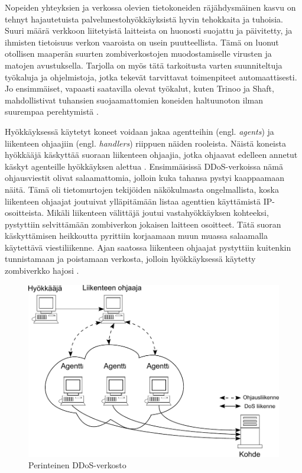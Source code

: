 Nopeiden yhteyksien ja verkossa olevien tietokoneiden räjähdysmäinen
kasvu on tehnyt hajautetuista palvelunestohyökkäyksistä hyvin
tehokkaita ja tuhoisia. Suuri määrä verkkoon liitetyistä laitteista on
huonosti suojattu ja päivitetty, ja ihmisten tietoisuus verkon
vaaroista on usein puutteellista. Tämä on luonut otollisen maaperän
suurten zombiverkostojen muodostamiselle virusten ja matojen
avustuksella. Tarjolla on myös tätä tarkoitusta varten suunniteltuja
työkaluja ja ohjelmistoja, jotka tekevät tarvittavat toimenpiteet
automaattisesti. Jo ensimmäiset, vapaasti saatavilla olevat työkalut,
kuten Trinoo ja Shaft, mahdollistivat tuhansien suojaamattomien
koneiden haltuunoton ilman suurempaa perehtymistä \cite{DDOS}.

Hyökkäyksessä käytetyt koneet voidaan jakaa agentteihin (engl. \textit{agents})
ja liikenteen ohjaajiin (engl. \textit{handlers}) riippuen näiden
rooleista. Näistä koneista hyökkääjä käskyttää suoraan liikenteen
ohjaajia, jotka ohjaavat edelleen annetut käskyt agenteille
hyökkäyksen alettua \cite{WEBS}\cite{DDOS}. Ensimmäisissä 
DDoS-verkoissa nämä ohjausviestit olivat salaamattomia, jolloin kuka tahansa
pystyi kaappaamaan näitä. Tämä oli tietomurtojen tekijöiden
näkökulmasta ongelmallista, koska liikenteen ohjaajat joutuivat
ylläpitämään listaa agenttien käyttämistä IP-osoitteista. Mikäli liikenteen välittäjä
joutui vastahyökkäyksen kohteeksi, pystyttiin selvittämään zombiverkon jokaisen
laitteen osoitteet. Tätä suoran käskyttämisen heikkoutta pyrittiin korjaamaan muun
muassa salaamalla käytettävä viestiliikenne. Ajan saatossa liikenteen
ohjaajat pystyttiin kuitenkin tunnistamaan ja poistamaan verkosta,
jolloin hyökkäyksessä käytetty zombiverkko hajosi \cite{DDOS}.

\begin{figure}[htp]
\centering
\includegraphics[width=12cm]{pics/perinteinen_ddos.pdf}
\caption{Perinteinen DDoS-verkosto}
\label{ddos1}
\end{figure}

